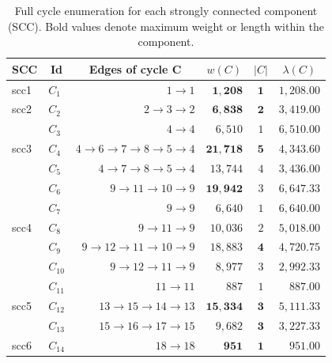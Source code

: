 \documentclass{article}
\theoremstyle{definition}
\begin{document}
\begin{table}[ht]
  \centering
  \caption{Full cycle enumeration for each strongly connected
    component (SCC). Bold values denote maximum weight or length
    within the component.}
  \label{tab:example2}
  \footnotesize
  \begin{tabular}{llrrcr}
    \toprule
    \multicolumn{1}{c}{SCC} & \multicolumn{1}{c}{Id} & \multicolumn{1}{c}{Edges of cycle C} & \multicolumn{1}{c}{$w(C)$} & \multicolumn{1}{c}{$|C|$} & \multicolumn{1}{c}{$\lambda(C)$} \\
    \midrule
    scc1 & $C_{1}$ & $1 \rightarrow 1$ & $\mathbf{1,208}$ & $\mathbf{1}$ & $1,208.00$ \\
    \midrule %
    scc2 & $C_{2}$ & $2 \rightarrow 3 \rightarrow 2$ & $\mathbf{6,838}$ & $\mathbf{2}$ & $3,419.00$ \\
    \midrule %
         & $C_{3}$ & $4 \rightarrow 4$ & $6,510$ & $1$ & $6,510.00$ \\
    scc3 & $C_{4}$ & $4 \rightarrow 6 \rightarrow 7 \rightarrow 8 \rightarrow 5 \rightarrow 4$ & $\mathbf{21,718}$ & $\mathbf{5}$ & $4,343.60$ \\
         & $C_{5}$ & $4 \rightarrow 7 \rightarrow 8 \rightarrow 5 \rightarrow 4$ & $13,744$ & $4$ & $3,436.00$ \\
    \midrule %
         & $C_{6}$ & $9 \rightarrow 11 \rightarrow 10 \rightarrow 9$ & $\mathbf{19,942}$ & $3$ & $6,647.33$ \\
         & $C_{7}$ & $9 \rightarrow 9$ & $6,640$ & $1$ & $6,640.00$ \\
    scc4 & $C_{8}$ & $9 \rightarrow 11 \rightarrow 9$ & $10,036$ & $2$ & $5,018.00$ \\
         & $C_{9}$ & $9 \rightarrow 12 \rightarrow 11 \rightarrow 10 \rightarrow 9$ & $18,883$ & $\mathbf{4}$ & $4,720.75$ \\
         & $C_{10}$ & $9 \rightarrow 12 \rightarrow 11 \rightarrow 9$ & $8,977$ & $3$ & $2,992.33$ \\
         & $C_{11}$ & $11 \rightarrow 11$ & $887$ & $1$ & $887.00$ \\
    \midrule %
    scc5 & $C_{12}$ & $13 \rightarrow 15 \rightarrow 14 \rightarrow 13$ & $\mathbf{15,334}$ & $\mathbf{3}$ & $5,111.33$ \\
         & $C_{13}$ & $15 \rightarrow 16 \rightarrow 17 \rightarrow 15$ & $9,682$ & $\mathbf{3}$ & $3,227.33$ \\
    \midrule %
    scc6 & $C_{14}$ & $18 \rightarrow 18$ & $\mathbf{951}$ & $\mathbf{1}$ & $951.00$ \\
    \bottomrule
  \end{tabular}
\end{table}
\end{document}
